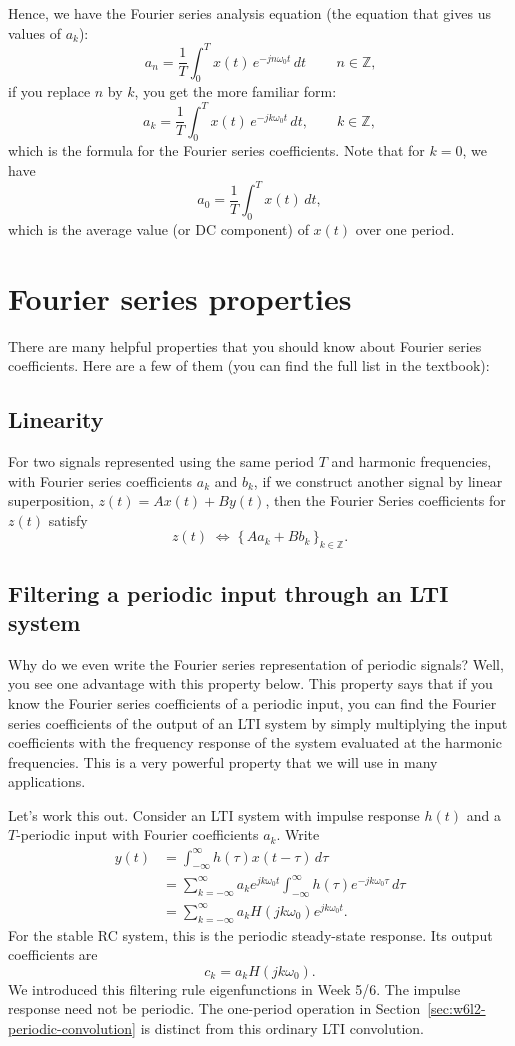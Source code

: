 Hence, we have the Fourier series analysis equation (the equation that gives us values of $a_k$):
\[
\,a_n=\frac{1}{T}\int_{0}^{T} x(t)\,e^{-jn\omega_0 t}\,dt\,
\qquad n\in\mathbb{Z},
\]
if you replace $n$ by $k$, you get the more familiar form:
\[
a_k=\frac{1}{T}\int_{0}^{T} x(t)\,e^{-jk\omega_0 t}\,dt,
\qquad k\in\mathbb{Z},
\]
which is the formula for the Fourier series coefficients.
Note that for $k=0$, we have
\[
a_0=\frac{1}{T}\int_{0}^{T} x(t)\,dt,
\]
which is the average value (or DC component) of $x(t)$ over one period.

\section{Fourier series properties}
\label{sec:w6l2-properties}
There are many helpful properties that you should know about Fourier series coefficients. Here are a few of them (you can find the full list in the textbook):

\subsection{Linearity}

For two signals represented using the same period $T$ and harmonic frequencies, with Fourier series coefficients $a_k$ and $b_k$, if we construct another signal by linear superposition, $z(t)=A x(t)+B y(t)$, then the Fourier Series coefficients for $z(t)$ satisfy
\[
z(t)\;\Longleftrightarrow\; \{\,A a_k + B b_k\,\}_{k\in\mathbb{Z}}.
\]
\subsection{Filtering a periodic input through an LTI system}
\label{sec:w6l2-filtering}
Why do we even write the Fourier series representation of periodic signals? Well, you see one advantage with this property below. This property says that if you know the Fourier series coefficients of a periodic input, you can find the Fourier series coefficients of the output of an LTI system by simply multiplying the input coefficients with the frequency response of the system evaluated at the harmonic frequencies. This is a very powerful property that we will use in many applications.

Let's work this out. Consider an LTI system with impulse response $h(t)$ and a $T$-periodic input
with Fourier coefficients $a_k$. Write
\begin{align*}
y(t)&=\int_{-\infty}^{\infty}h(\tau)x(t-\tau)\,d\tau\\
&=\sum_{k=-\infty}^{\infty}a_k e^{jk\omega_0t}
  \int_{-\infty}^{\infty}h(\tau)e^{-jk\omega_0\tau}\,d\tau\\
&=\sum_{k=-\infty}^{\infty}a_k H(jk\omega_0)e^{jk\omega_0t}.
\end{align*}
For the stable RC system, this is the periodic steady-state response.
Its output coefficients are
\[
\boxed{c_k=a_kH(jk\omega_0).}
\]
We introduced this filtering rule 
eigenfunctions in Week 5/6. The impulse response need not be periodic.
The one-period operation in Section~\ref{sec:w6l2-periodic-convolution}
is distinct from this ordinary LTI convolution.

